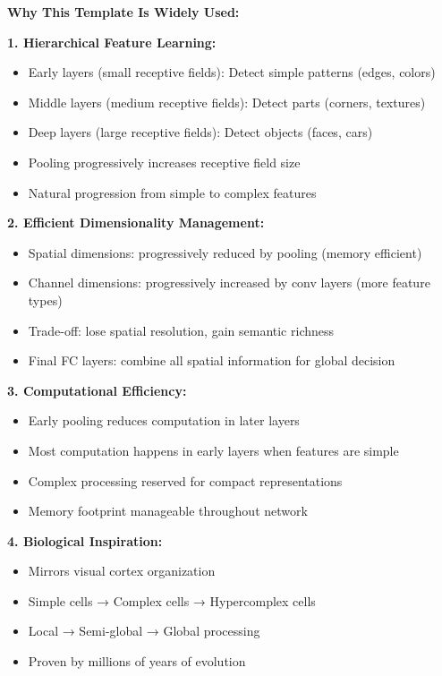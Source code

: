 \documentclass[12pt]{article}
\newcommand{\explanation}[1]{{\color{explanationcolor}#1}}
\begin{document}
\begin{enumerate}[(a)]
{    \textbf{Why This Template Is Widely Used:}
    
    \explanation{
    \textbf{1. Hierarchical Feature Learning:}
    \begin{itemize}
        \item Early layers (small receptive fields): Detect simple patterns (edges, colors)
        \item Middle layers (medium receptive fields): Detect parts (corners, textures)
        \item Deep layers (large receptive fields): Detect objects (faces, cars)
        \item Pooling progressively increases receptive field size
        \item Natural progression from simple to complex features
    \end{itemize}
    
    \textbf{2. Efficient Dimensionality Management:}
    \begin{itemize}
        \item Spatial dimensions: progressively reduced by pooling (memory efficient)
        \item Channel dimensions: progressively increased by conv layers (more feature types)
        \item Trade-off: lose spatial resolution, gain semantic richness
        \item Final FC layers: combine all spatial information for global decision
    \end{itemize}
    
    \textbf{3. Computational Efficiency:}
    \begin{itemize}
        \item Early pooling reduces computation in later layers
        \item Most computation happens in early layers when features are simple
        \item Complex processing reserved for compact representations
        \item Memory footprint manageable throughout network
    \end{itemize}
    
    \textbf{4. Biological Inspiration:}
    \begin{itemize}
        \item Mirrors visual cortex organization
        \item Simple cells → Complex cells → Hypercomplex cells
        \item Local → Semi-global → Global processing
        \item Proven by millions of years of evolution
    \end{itemize}
    
}}
\end{enumerate}
\end{document}
